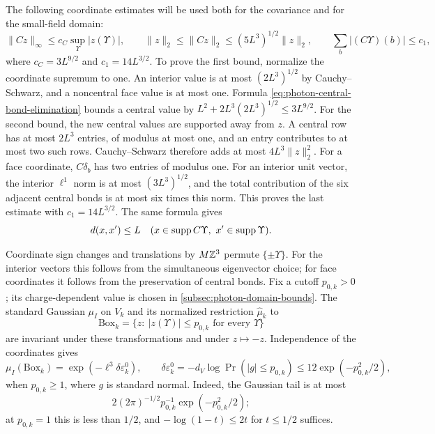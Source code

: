 The following coordinate estimates will be used both for the
covariance and for the small-field domain:
\begin{equation}\label{eq:photon-coordinate-estimates}
 \|Cz\|_\infty\le c_C\sup_\Upsilon|z(\Upsilon)|,
 \qquad
 \|z\|_2\le\|Cz\|_2\le(5L^3)^{1/2}\|z\|_2,
 \qquad
 \sum_b|(C\Upsilon)(b)|\le c_1,
\end{equation}
where $c_C=3L^{9/2}$ and $c_1=14L^{3/2}$. To prove the first
bound, normalize the coordinate supremum to one. An interior value
is at most $(2L^3)^{1/2}$ by Cauchy--Schwarz, and a noncentral face
value is at most one. Formula
\eqref{eq:photon-central-bond-elimination} bounds a central value
by $L^2+2L^3(2L^3)^{1/2}\le3L^{9/2}$.
For the second bound, the new central values are supported away
from $z$. A central row has at most $2L^3$ entries, of modulus at
most one, and an entry contributes to at most two such rows.
Cauchy--Schwarz therefore adds at most $4L^3\|z\|_2^2$.
For a face coordinate, $C\delta_b$ has two entries of modulus one.
For an interior unit vector, the interior $\ell^1$ norm is at most
$(3L^3)^{1/2}$, and the total contribution of the six adjacent
central bonds is at most six times this norm. This proves the
last estimate with $c_1=14L^{3/2}$.
The same formula gives
\begin{equation}\label{eq:photon-coordinate-support}
 d(x,x')\le L\quad
 (x\in\operatorname{supp} C\Upsilon,\ x'\in\operatorname{supp}\Upsilon).
\end{equation}

Coordinate sign changes and translations by $M\mathbb Z^3$ permute
$\{\pm\Upsilon\}$. For the interior vectors this follows from the
simultaneous eigenvector choice; for face coordinates it follows
from the preservation of central bonds. Fix a cutoff $p_{0,k}>0$;
its charge-dependent value is chosen in
\cref{subsec:photon-domain-bounds}.
The standard Gaussian
$\mu_I$ on $V_k$ and its normalized restriction $\widehat\mu_k$ to
\[
 \mathrm{Box}_k=
 \{z:\ |z(\Upsilon)|\le p_{0,k}\text{ for every }\Upsilon\}
\]
are invariant under these transformations and under $z\mapsto-z$.
Independence of the coordinates gives
\begin{equation}\label{eq:photon-Gaussian-box-mass}
 \mu_I(\mathrm{Box}_k)=\exp(-\ell^3\delta\varepsilon^0_k),
 \qquad
 \delta\varepsilon^0_k=-d_V\log\Pr(|g|\le p_{0,k})
            \le12\exp(-p_{0,k}^2/2),
\end{equation}
when $p_{0,k}\ge1$, where $g$ is standard normal.
Indeed, the Gaussian tail is at most
\[
 2(2\pi)^{-1/2}p_{0,k}^{-1}\exp(-p_{0,k}^2/2);
\]
at
$p_{0,k}=1$ this is less than $1/2$, and
$-\log(1-t)\le2t$ for $t\le1/2$ suffices.

